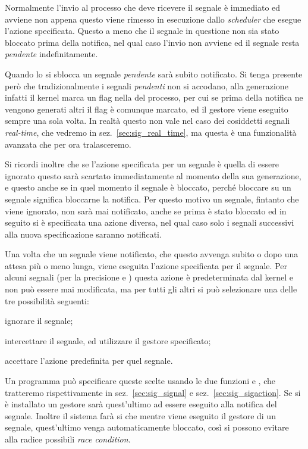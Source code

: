 Normalmente l'invio al processo che deve ricevere il segnale è immediato ed
avviene non appena questo viene rimesso in esecuzione dallo \textit{scheduler}
che esegue l'azione specificata. Questo a meno che il segnale in questione non
sia stato bloccato prima della notifica, nel qual caso l'invio non avviene ed
il segnale resta \textsl{pendente} indefinitamente.

Quando lo si sblocca un segnale \textsl{pendente} sarà subito notificato. Si
tenga presente però che tradizionalmente i segnali \textsl{pendenti} non si
accodano, alla generazione infatti il kernel marca un flag nella
 del processo, per cui se prima della notifica ne vengono
generati altri il flag è comunque marcato, ed il gestore viene eseguito sempre
una sola volta. In realtà questo non vale nel caso dei cosiddetti segnali
\textit{real-time}, che vedremo in sez.~\ref{sec:sig_real_time}, ma questa è
una funzionalità avanzata che per ora tralasceremo.

Si ricordi inoltre che se l'azione specificata per un segnale è quella di
essere ignorato questo sarà scartato immediatamente al momento della sua
generazione, e questo anche se in quel momento il segnale è bloccato, perché
bloccare su un segnale significa bloccarne la notifica. Per questo motivo un
segnale, fintanto che viene ignorato, non sarà mai notificato, anche se prima
è stato bloccato ed in seguito si è specificata una azione diversa, nel qual
caso solo i segnali successivi alla nuova specificazione saranno notificati.

Una volta che un segnale viene notificato, che questo avvenga subito o dopo
una attesa più o meno lunga, viene eseguita l'azione specificata per il
segnale. Per alcuni segnali (per la precisione  e
) questa azione è predeterminata dal kernel e non può essere
mai modificata, ma per tutti gli altri si può selezionare una delle tre
possibilità seguenti:

\begin{itemize*}
\item ignorare il segnale;
\item intercettare il segnale, ed utilizzare il gestore specificato;
\item accettare l'azione predefinita per quel segnale.
\end{itemize*}

Un programma può specificare queste scelte usando le due funzioni
 e , che tratteremo rispettivamente in
sez.~\ref{sec:sig_signal} e sez.~\ref{sec:sig_sigaction}. Se si è installato
un gestore sarà quest'ultimo ad essere eseguito alla notifica del segnale.
Inoltre il sistema farà si che mentre viene eseguito il gestore di un segnale,
quest'ultimo venga automaticamente bloccato, così si possono evitare alla
radice possibili \textit{race condition}.

